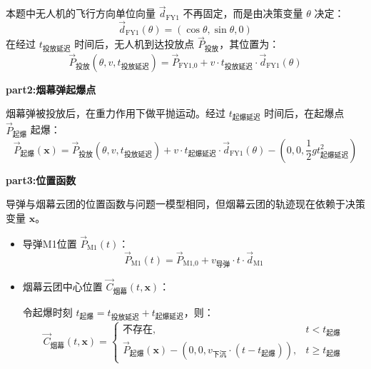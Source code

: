 \documentclass[5pt, withoutpreface,bwprint]{cumcmthesis} %
\begin{document}
本题中无人机的飞行方向单位向量 $\vec{d}_{\text{FY1}}$ 不再固定，而是由决策变量 $\theta$ 决定：
    \begin{equation} \vec{d}_{\text{FY1}}(\theta) = (\cos\theta, \sin\theta, 0) \end{equation}
    在经过 $t_{\text{投放延迟}}$ 时间后，无人机到达投放点 $\vec{P}_{\text{投放}}$，其位置为：
    \begin{equation}
        \vec{P}_{\text{投放}}(\theta, v, t_{\text{投放延迟}}) = \vec{P}_{\text{FY1,0}} + v \cdot t_{\text{投放延迟}} \cdot \vec{d}_{\text{FY1}}(\theta)
    \end{equation}
    
    \textbf{part2:烟幕弹起爆点}
    
    烟幕弹被投放后，在重力作用下做平抛运动。经过 $t_{\text{起爆延迟}}$ 时间后，在起爆点 $\vec{P}_{\text{起爆}}$ 起爆：
        \begin{equation}
            \vec{P}_{\text{起爆}}(\mathbf{x}) = \vec{P}_{\text{投放}}(\theta, v, t_{\text{投放延迟}}) + v \cdot t_{\text{起爆延迟}} \cdot \vec{d}_{\text{FY1}}(\theta) - \left(0, 0, \frac{1}{2}gt_{\text{起爆延迟}}^2\right)
        \end{equation}
    
    \textbf{part3:位置函数}
    
     导弹与烟幕云团的位置函数与问题一模型相同，但烟幕云团的轨迹现在依赖于决策变量 $\mathbf{x}$。
        \begin{itemize}
            \item 导弹M1位置 $\vec{P}_{\text{M1}}(t)$：
            \begin{equation}
                \vec{P}_{\text{M1}}(t) = \vec{P}_{\text{M1,0}} + v_{\text{导弹}} \cdot t \cdot \vec{d}_{\text{M1}}
            \end{equation}
            \item 烟幕云团中心位置 $\vec{C}_{\text{烟幕}}(t, \mathbf{x})$：
            
            令起爆时刻 $t_{\text{起爆}} = t_{\text{投放延迟}} + t_{\text{起爆延迟}}$，则：
            \begin{equation}
                \vec{C}_{\text{烟幕}}(t, \mathbf{x}) = 
                \begin{cases} 
                    \text{不存在}, & t < t_{\text{起爆}} \\ 
                    \vec{P}_{\text{起爆}}(\mathbf{x}) - (0, 0, v_{\text{下沉}} \cdot (t - t_{\text{起爆}})), & t \ge t_{\text{起爆}} 
                \end{cases}
            \end{equation}
        \end{itemize}
   
\end{document}
